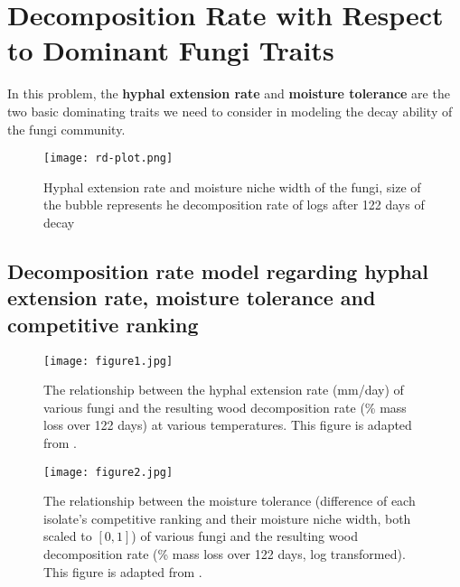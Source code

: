 \section{Decomposition Rate with Respect to Dominant Fungi Traits}\label{sec:rate}

In this problem, the \textbf{hyphal extension rate} and \textbf{moisture tolerance} are the two basic dominating traits we need to consider in modeling the decay ability of the fungi community.

\begin{figure}\label{fig:rd-plot}
    \begin{minipage}{0.6\textwidth}
        \texttt{[image: rd-plot.png]}
    \end{minipage}
    \begin{minipage}{0.4\textwidth}
        \caption{Hyphal extension rate and moisture niche width of the fungi, size of the bubble represents he decomposition rate of logs after 122 days of decay}
    \end{minipage}
\end{figure}


\subsection{Decomposition rate model regarding hyphal extension rate, moisture tolerance and competitive ranking}


\begin{figure}
    \centering
    \begin{minipage}[t]{0.48\textwidth}
        \centering
        \texttt{[image: figure1.jpg]}
        \caption{The relationship between the hyphal extension rate (mm/day) of various fungi and the resulting wood decomposition rate (\% mass loss over 122 days) at various temperatures. This figure is adapted from \cite{Lustenshouwer}.}\label{fig:hyphal}
    \end{minipage}
    \begin{minipage}[t]{0.48\textwidth}
        \centering
        \texttt{[image: figure2.jpg]}
        \caption{The relationship between the moisture tolerance (difference of each isolate’s competitive ranking and their moisture niche width, both scaled to $[0,1]$) of various fungi and the resulting wood decomposition rate (\% mass loss over 122 days, log transformed). This figure is adapted from \cite{Lustenshouwer}.}\label{fig:moisture}
    \end{minipage}
\end{figure}



